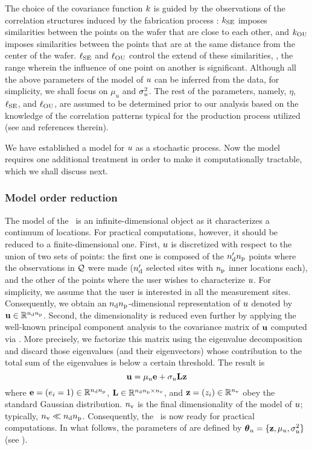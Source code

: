 The choice of the covariance function $\fCov$ is guided by the observations of the correlation structures induced by the fabrication process \cite{chandrakasan2001, cheng2011}: $\fCov_\SE$ imposes similarities between the points on the wafer that are close to each other, and $\fCov_\OU$ imposes similarities between the points that are at the same distance from the center of the wafer.
$\ell_{\text{SE}}$ and $\ell_{\text{OU}}$ control the extend of these similarities, \ie, the range wherein the influence of one point on another is significant.
Although all the above parameters of the model of $u$ can be inferred from the data, for simplicity, we shall focus on $\mu_u$ and $\sigma_u^2$.
The rest of the parameters, namely, $\eta$, $\ell_{\text{SE}}$, and $\ell_{\text{OU}}$, are assumed to be determined prior to our analysis based on the knowledge of the correlation patterns typical for the production process utilized (see \cite{marzouk2009} and references therein).

We have established a model for $u$ as a stochastic process.
Now the model requires one additional treatment in order to make it computationally tractable, which we shall discuss next.


\subsubsection{Model order reduction} 
The model of the \qoi\ is an infinite-dimensional object as it characterizes a continuum of locations.
For practical computations, however, it should be reduced to a finite-dimensional one.
First, $u$ is discretized with respect to the union of two sets of points: the first one is composed of the ${n_\text{d}'} {n_\text{p}}$ points where the observations in $\mathcal{Q}$ were made (${n_\text{d}'}$ selected sites with ${n_\text{p}}$ inner locations each), and the other of the points where the user wishes to characterize $u$.
For simplicity, we assume that the user is interested in all the measurement sites.
Consequently, we obtain an ${n_\text{d}} {n_\text{p}}$-dimensional representation of $u$ denoted by $\mathbf{u} \in \mathbb{R}^{{n_\text{d}} {n_\text{p}}}$.
Second, the dimensionality is reduced even further by applying the well-known principal component analysis to the covariance matrix of $\mathbf{u}$ computed via .
More precisely, we factorize this matrix using the eigenvalue decomposition \cite{press2007} and discard those eigenvalues (and their eigenvectors) whose contribution to the total sum of the eigenvalues is below a certain threshold.
The result is
\begin{equation} \elabel{kl-approximation}
  \vu = \mu_\u \vOne + \sigma_\u \mKL \vz
\end{equation}
where $\mathbf{e} = (e_i = 1) \in \mathbb{R}^{{n_\text{d}} {n_\text{p}}}$, $\mathbf{L} \in \mathbb{R}^{{n_\text{d}} {n_\text{p}} \times {n_\text{v}}}$, and $\mathbf{z} = (z_i) \in \mathbb{R}^{n_\text{v}}$ obey the standard Gaussian distribution.
${n_\text{v}}$ is the final dimensionality of the model of $u$; typically, ${n_\text{v}} \ll {n_\text{d}} {n_\text{p}}$.
Consequently, the \qoi\ is now ready for practical computations.
In what follows, the parameters of  are defined by ${\boldsymbol\theta}_u = \{ \mathbf{z}, \mu_u, \sigma^2_u \}$ (see ).

